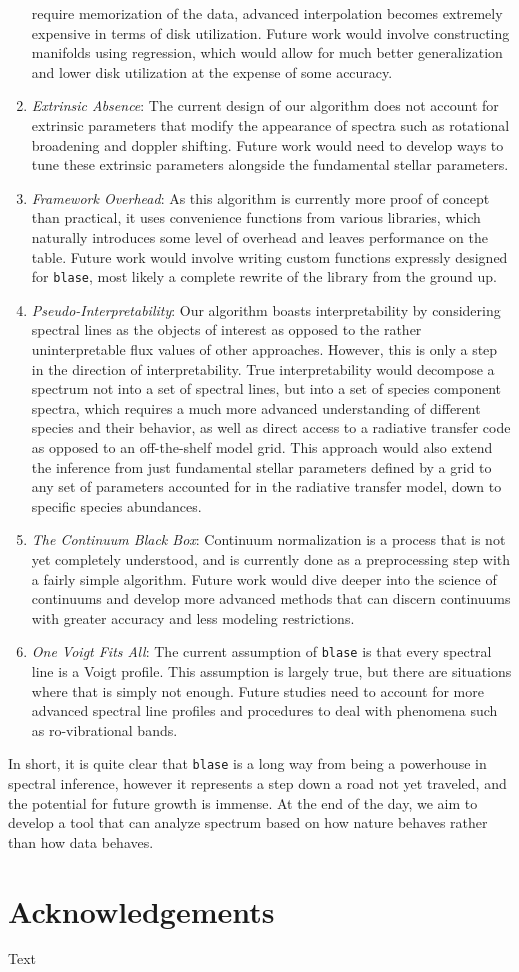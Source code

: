 \documentclass[twocolumn]{aastex631}
\begin{document}
\begin{enumerate}[label=-]
    require memorization of the data, advanced interpolation becomes extremely
    expensive in terms of disk utilization. Future work would involve 
    constructing manifolds using regression, which would allow for much
    better generalization and lower disk utilization at the expense of
    some accuracy.
    \item \textit{Extrinsic Absence}: The current design of our algorithm
    does not account for extrinsic parameters that modify the appearance of 
    spectra such as rotational broadening and doppler shifting. Future work
    would need to develop ways to tune these extrinsic parameters alongside
    the fundamental stellar parameters.
    \item \textit{Framework Overhead}: As this algorithm is currently more 
    proof of concept than practical, it uses convenience functions from 
    various libraries, which naturally introduces some level of overhead and 
    leaves performance on the table. Future work would involve writing 
    custom functions expressly designed for \texttt{blase}, most likely a 
    complete rewrite of the library from the ground up.
    \item \textit{Pseudo-Interpretability}: Our algorithm boasts interpretability
    by considering spectral lines as the objects of interest as opposed to 
    the rather uninterpretable flux values of other approaches. However, this
    is only a step in the direction of interpretability. True interpretability
    would decompose a spectrum not into a set of spectral lines, but into a
    set of species component spectra, which requires a much more advanced 
    understanding of different species and their behavior, as well as
    direct access to a radiative transfer code as opposed to an off-the-shelf
    model grid. This approach would also extend the inference from just
    fundamental stellar parameters defined by a grid to any set of parameters
    accounted for in the radiative transfer model, down to specific species
    abundances.
    \item \textit{The Continuum Black Box}: Continuum normalization is a
    process that is not yet completely understood, and is currently done as 
    a preprocessing step with a fairly simple algorithm. Future work would
    dive deeper into the science of continuums and develop more advanced 
    methods that can discern continuums with greater accuracy and less
    modeling restrictions.
    \item \textit{One Voigt Fits All}: The current assumption of \texttt{blase}
    is that every spectral line is a Voigt profile. This assumption is largely
    true, but there are situations where that is simply not enough. Future
    studies need to account for more advanced spectral line profiles and 
    procedures to deal with phenomena such as ro-vibrational bands.
\end{enumerate}
In short, it is quite clear that \texttt{blase} is a long way from being a
powerhouse in spectral inference, however it represents a step down a road
not yet traveled, and the potential for future growth is immense. At the 
end of the day, we aim to develop a tool that can analyze spectrum based on 
how nature behaves rather than how data behaves.

\section*{Acknowledgements}
Text
\end{document}

